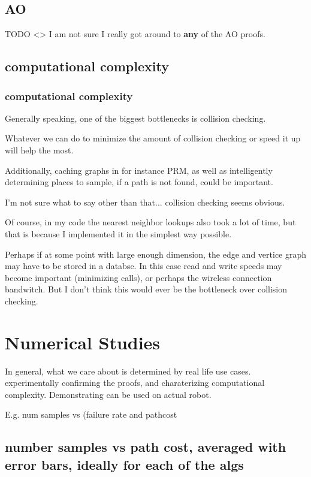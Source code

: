 \documentclass[a4paper]{article}
\begin{document}
\subsection{AO}

TODO <> %
I am not sure I really got around to \textbf{any} of the AO proofs.


\subsection{computational complexity}

\subsubsection{computational complexity}

Generally speaking, one of the biggest bottlenecks is collision checking.

Whatever we can do to minimize the amount of collision checking or speed it up
    will help the most.

Additionally, caching graphs in for instance PRM, as well as intelligently
    determining places to sample, if a path is not found, could be important.

I'm not sure what to say other than that... collision checking seems obvious.

Of course, in my code the nearest neighbor lookups also took a lot of time, but
that is because I implemented it in the simplest way possible.

Perhaps if at some point with large enough dimension, the edge and vertice graph may have
    to be stored in a databse. In this case read and write speeds may become
    important (minimizing calls), or perhaps the wireless connection bandwitch.
    But I don't think this would ever be the bottleneck over collision
    checking.

\section{Numerical Studies}

In general, what we care about is determined by real life use cases.
    experimentally confirming the proofs, and charaterizing computational
    complexity. Demonstrating can be used on actual robot.

    E.g. num samples vs (failure rate and pathcost

\subsection{number samples vs path cost, averaged with error bars, ideally for each of the algs  }
\end{document}
